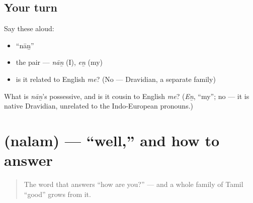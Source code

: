 \subsection*{Your turn}
Say these aloud:

\begin{itemize}
\raggedright
  \item \textquotedblleft{}nāṉ\textquotedblright{}
  \item the pair — \emph{nāṉ} (I), \emph{eṉ} (my)
  \item is it related to English \emph{me}? (No — Dravidian, a separate family)
\end{itemize}

\begin{tcolorbox}[breakable,colback=teal!4,colframe=teal!35!black,title={Before you move on}]
What is \emph{nāṉ}'s possessive, and is it cousin to English \emph{me}? (\emph{Eṉ}, \textquotedblleft{}my\textquotedblright{}; no — it is native Dravidian, unrelated to the Indo-European pronouns.)
\end{tcolorbox}
\section[\texorpdfstring{\ta{நலம்} (nalam)}{நலம் (nalam)}]{ (nalam) — \textquotedblleft{}well,\textquotedblright{} and how to answer}

\label{lesson:TA-C03-nalam}



\begin{quote}
The word that answers \textquotedblleft{}how are you?\textquotedblright{} — and a whole family of Tamil \textquotedblleft{}good\textquotedblright{} grows from it.
\end{quote}

